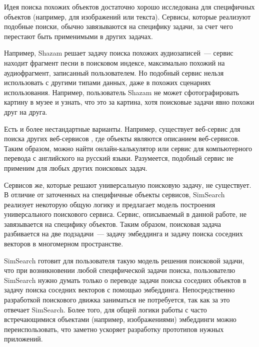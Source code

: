 \documentclass[a4paper,12pt]{extarticle}
\begin{document}
Идея поиска похожих объектов достаточно хорошо исследована для специфичных объектов (например, для изображений или текста). Сервисы, которые реализуют подобные поиски, обычно завязываются на специфику задачи, за счет чего перестают быть применимыми в других задачах.

Например, Shazam\cite{shazam} решает задачу поиска  похожих аудиозаписей~--- сервис находит фрагмент песни в поисковом индексе, максимально похожий на аудиофрагмент, записанный пользователем. Но подобный сервис нельзя использовать с другими типами данных, даже в похожих сценариях использования. Например, пользователь Shazam не может сфотографировать картину в музее и узнать, что это за картина, хотя поисковые задачи явно похожи друг на друга.

Есть и более нестандартные варианты. Например, существует веб-сервис для поиска других веб-сервисов \cite{ngu2014servicexplorer}, где объекты являются описанием веб-сервисов. Таким образом, можно найти онлайн-калькулятор или сервис для компьютерного перевода с английского на русский языки. Разумеется, подобный сервис не применим для любых других поисковых задач.

Сервисов же, которые решают универсальную поисковую задачу, не существует. В отличие от заточенных на специфичные объекты сервисов, SimSearch реализует некоторую общую логику и предлагает модель построения универсального поискового сервиса. Сервис, описываемый в данной работе, не завязывается на специфику объектов. Таким образом, поисковая задача разбивается на две подзадачи~--- задачу эмбеддинга \cite{embedding} и задачу поиска соседних векторов в многомерном пространстве.

SimSearch готовит для пользователя такую модель решения поисковой задачи, что при возникновении любой специфической задачи поиска, пользователю SimSearch нужно думать только о переводе задачи поиска соседних объектов в задачу поиска соседних векторов с помощью эмбеддинга. Непосредственно разработкой поискового движка заниматься не потребуется, так как за это отвечает SimSearch. Более того, для общей логики работы с часто встречающимися объектами (например, изображениями) эмбеддинги можно переиспользовать, что заметно ускоряет разработку прототипов нужных приложений.
\end{document}
